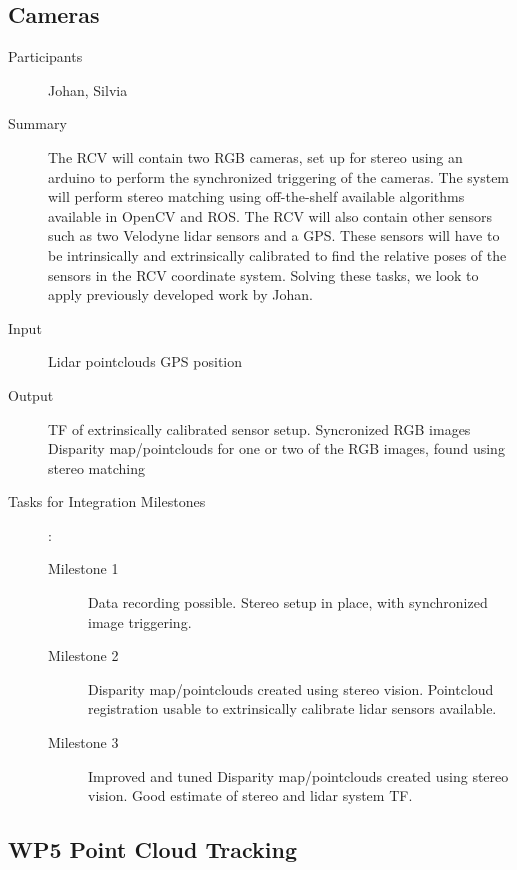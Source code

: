 \documentclass[11pt,a4paper]{article}
\begin{document}
\subsection{Cameras} %
\begin{description}
\item[Participants] Johan, Silvia
\item[Summary]

The RCV will contain two RGB cameras, set up for stereo using an arduino to perform the synchronized triggering of the cameras. The system will perform stereo matching using off-the-shelf available algorithms available in OpenCV and ROS. The RCV will also contain other sensors such as two Velodyne lidar sensors and a GPS. These sensors will have to be intrinsically and extrinsically calibrated to find the relative poses of the sensors in the RCV coordinate system. Solving these tasks, we look to apply previously developed work by Johan. 

\item[Input]
	Lidar pointclouds
	GPS position
\item[Output]
	TF of extrinsically calibrated sensor setup.
	Syncronized RGB images
	Disparity map/pointclouds for one or two of the RGB images, found using stereo matching
\item[Tasks for Integration Milestones]:\
	\begin{description}
		\item[Milestone 1]
			Data recording possible.
			Stereo setup in place, with synchronized image triggering.
		\item[Milestone 2]
			Disparity map/pointclouds created using stereo vision.
			Pointcloud registration usable to extrinsically calibrate lidar sensors available.
		\item[Milestone 3]
			Improved and tuned Disparity map/pointclouds created using stereo vision.
			Good estimate of stereo and lidar system TF.
	\end{description}	 
\end{description}

\subsection{WP5 Point Cloud Tracking}
\end{document}
